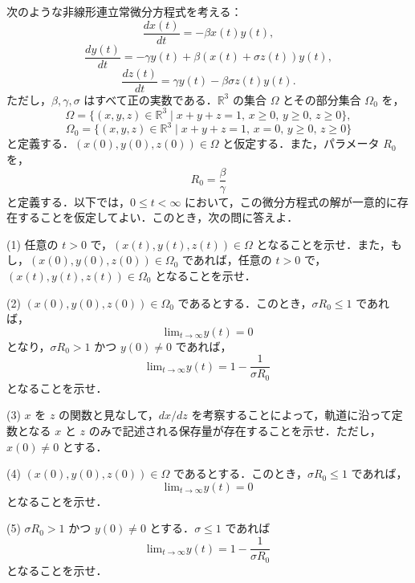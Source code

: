 \documentclass[12pt]{jlreq}
\newcommand{\R}{\mathbb{R}}
\begin{document}
次のような非線形連立常微分方程式を考える：
\[
  \frac{dx(t)}{dt} = -\beta x(t)y(t),
\]
\[
  \frac{dy(t)}{dt} = -\gamma y(t) + \beta (x(t) + \sigma z(t))y(t),
\]
\[
  \frac{dz(t)}{dt} = \gamma y(t) - \beta \sigma z(t) y(t).
\]
ただし，\(\beta, \gamma, \sigma\) はすべて正の実数である．\(\R^3\) の集合 \(\Omega\) とその部分集合 \(\Omega_0\) を，
\[
  \Omega = \{ (x,y,z) \in \R^3 \mid x + y + z = 1,\, x \ge 0,\, y \ge 0,\, z \ge 0 \},
\]
\[
  \Omega_0 = \{ (x,y,z) \in \R^3 \mid x + y + z = 1,\, x = 0,\, y \ge 0,\, z \ge 0 \}
\]
と定義する．\((x(0), y(0), z(0)) \in \Omega\) と仮定する．また，パラメータ \(R_0\) を，
\[
  R_0 = \frac{\beta}{\gamma}
\]
と定義する．以下では，\(0 \le t < \infty\) において，この微分方程式の解が一意的に存在することを仮定してよい．このとき，次の問に答えよ．

(1) 任意の \(t > 0\) で，\((x(t), y(t), z(t)) \in \Omega\) となることを示せ．また，もし，\((x(0), y(0), z(0)) \in \Omega_0\) であれば，任意の \(t > 0\) で，\((x(t), y(t), z(t)) \in \Omega_0\) となることを示せ．

(2) \((x(0), y(0), z(0)) \in \Omega_0\) であるとする．このとき，\(\sigma R_0 \le 1\) であれば，
  \[
    \text{lim}_{t \to \infty} y(t) = 0
  \]
  となり，\(\sigma R_0 > 1\) かつ \(y(0) \ne 0\) であれば，
  \[
    \text{lim}_{t \to \infty} y(t) = 1 - \frac{1}{\sigma R_0}
  \]
  となることを示せ．

(3) \(x\) を \(z\) の関数と見なして，\(dx/dz\) を考察することによって，軌道に沿って定数となる \(x\) と \(z\) のみで記述される保存量が存在することを示せ．ただし，\(x(0) \ne 0\) とする．

(4) \((x(0), y(0), z(0)) \in \Omega\) であるとする．このとき，\(\sigma R_0 \le 1\) であれば，
  \[
    \text{lim}_{t \to \infty} y(t) = 0
  \]
  となることを示せ．

(5) \(\sigma R_0 > 1\) かつ \(y(0) \ne 0\) とする．\(\sigma \le 1\) であれば
  \[
    \text{lim}_{t \to \infty} y(t) = 1 - \frac{1}{\sigma R_0}
  \]
  となることを示せ．
\end{document}

